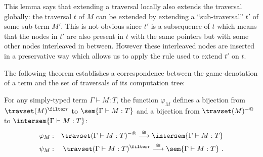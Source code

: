 This lemma says that extending a traversal locally also extends the traversal globally: the traversal $t$ of $M$ can be extended by extending a ``sub-traversal'' $t'$ of some sub-term $M'$.
This is not obvious since $t'$ is a subsequence of $t$ which means that
the nodes in $t'$ are also present in $t$ with the same pointers but with some other nodes interleaved in between. However these interleaved nodes are inserted in a preservative way which allows us to apply the rule used to extend $t'$ on $t$.
\bigskip

The following theorem establishes a correspondence between the
game-denotation of a term and the set of traversals of its
computation tree:
\begin{theorem}
\label{thm:correspondence}
 For any simply-typed term $\Gamma \vdash M :T$,
the function $\varphi_M$ defines a bijection from $\travset(M)^{\filter
r}$ to $\sem{\Gamma \vdash M : T}$ and a bijection from
$\travset(M)^{-@}$ to $\intersem{\Gamma \vdash M : T}$:
\begin{eqnarray*}
 \varphi_M  &:& \travset(\Gamma \vdash M : T)^{-@} \stackrel{\cong}{\longrightarrow} \intersem{\Gamma \vdash M :T} \\
 \psi_M  &:& \travset(\Gamma \vdash M : T)^{\filter r} \stackrel{\cong}{\longrightarrow} \sem{\Gamma \vdash M :T} \ .
\end{eqnarray*}

\end{theorem}


